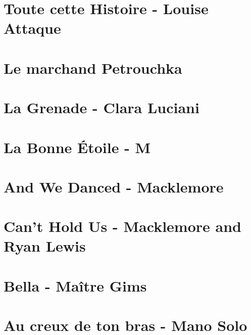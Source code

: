 \documentclass[11pt]{article}
\begin{document}
\section{Toute cette Histoire - Louise Attaque}


\section{Le marchand Petrouchka}
\begin{guitar}

\end{guitar}

\section{La Grenade - Clara Luciani}
\begin{guitar}

\end{guitar}

\section{La Bonne Étoile - M}
\begin{guitar}

\end{guitar}

\section{And We Danced - Macklemore}
\begin{guitar}

\end{guitar}

\section{Can't Hold Us - Macklemore and Ryan Lewis}
\begin{guitar}

\end{guitar}

\section{Bella - Maître Gims}
\begin{guitar}

\end{guitar}


\section{Au creux de ton bras - Mano Solo}
\begin{guitar}

\end{guitar}
\end{document}

